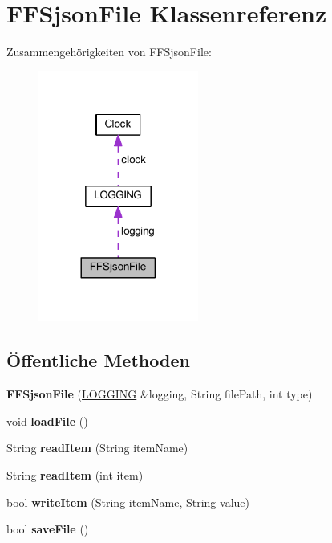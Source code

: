 \hypertarget{class_f_f_sjson_file}{}\section{F\+F\+Sjson\+File Klassenreferenz}
\label{class_f_f_sjson_file}


Zusammengehörigkeiten von F\+F\+Sjson\+File\+:
\nopagebreak
\begin{figure}[H]
\begin{center}
\leavevmode
\includegraphics[width=149pt]{class_f_f_sjson_file__coll__graph}
\end{center}
\end{figure}
\subsection*{Öffentliche Methoden}
\begin{DoxyCompactItemize}
\item 
\mbox{\label{class_f_f_sjson_file_aa4393b7da47cccc2a814c1341cff4955}} 
{\bfseries F\+F\+Sjson\+File} (\hyperlink{class_l_o_g_g_i_n_g}{L\+O\+G\+G\+I\+NG} \&logging, String file\+Path, int type)
\item 
\mbox{\label{class_f_f_sjson_file_a401e5929ca848aebeec6b32ef8a78383}} 
void {\bfseries load\+File} ()
\item 
\mbox{\label{class_f_f_sjson_file_a9a0f18ad2d55bcffb605d66a47d212d3}} 
String {\bfseries read\+Item} (String item\+Name)
\item 
\mbox{\label{class_f_f_sjson_file_a1063b4ab2e854c77e5f8080b62c4f6de}} 
String {\bfseries read\+Item} (int item)
\item 
\mbox{\label{class_f_f_sjson_file_a3fb3b4ff7dbfb9e52d11af0047bdce1f}} 
bool {\bfseries write\+Item} (String item\+Name, String value)
\item 
\mbox{\label{class_f_f_sjson_file_a157ab2e2736a52931ded20986af0f46a}} 
bool {\bfseries save\+File} ()
\end{DoxyCompactItemize}
